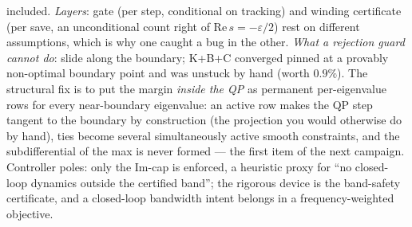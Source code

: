 \documentclass[11pt,a4paper]{article}
\newcommand{\eps}{\varepsilon}
\newcommand{\rev}[1]{#1}
\begin{document}
included.  \emph{Layers}: gate (per step, conditional on tracking) and winding certificate
(per save, an unconditional count right of $\mathrm{Re}\,s=-\eps/2$) rest on different
assumptions, which is why one caught a bug in the other.  \emph{What a rejection guard
cannot do}: slide along the boundary; K+B+C converged pinned at a provably non-optimal
boundary point and was unstuck by hand (worth $0.9\%$).  \rev{The structural fix is to put the margin \emph{inside the QP} as permanent
per-eigenvalue rows for every near-boundary eigenvalue: an active row makes the QP step
tangent to the boundary by construction (the projection you would otherwise do by hand),
ties become several simultaneously active smooth constraints, and the subdifferential of
the max is never formed --- the first item of the next campaign.}  Controller poles: only the
$\mathrm{Im}$-cap is enforced, a heuristic proxy for ``no closed-loop dynamics outside the
certified band''; the rigorous device is the band-safety certificate, and a closed-loop
bandwidth intent belongs in a frequency-weighted objective.
\end{document}
